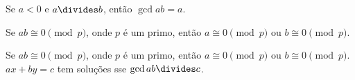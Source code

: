 \begin{exercise}
	Se $a < 0$ e $a\divides b$, então $\gcd a b = a$.
\end{exercise}

\begin{exercise}
	Se $ab\cong 0\pmod p$, onde $p$ é um primo, então $a\cong 0\pmod p$ ou $b\cong 0\pmod p$.
\end{exercise}

\begin{exercise}
	Se $ab\cong 0\pmod p$, onde $p$ é um primo, então $a\cong 0\pmod p$ ou $b\cong 0\pmod p$.
	$ax + by = c$ tem soluções sse $\gcd a b\divides c$.
\end{exercise}


